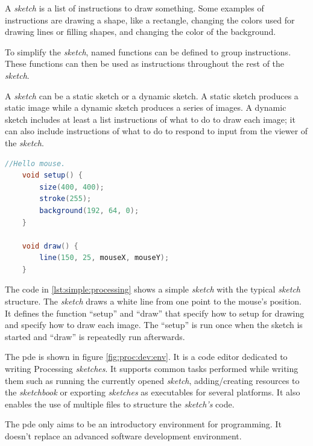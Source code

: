 \documentclass{./llncs2e/llncs}
\begin{document}
	A \emph{sketch} is a list of instructions to draw something. 
	Some examples of instructions are drawing a shape, like a rectangle, changing the colors used for drawing lines or filling shapes, and changing the color of the background.
	
	To simplify the \emph{sketch}, named functions can be defined to group instructions. 
	These functions can then be used as instructions throughout the rest of the \emph{sketch}.
	
	A \emph{sketch} can be a static sketch or a dynamic sketch. 
	A static sketch produces a static image while a dynamic sketch produces a series of images. 
	A dynamic sketch includes at least a list instructions of what to do to draw each image; it can also include instructions of what to do to respond to input from the viewer of the \emph{sketch}.
	
	\begin{lstlisting}[caption={A simple Processing sketch},label={lst:simple:processing},language=Java]
	//Hello mouse.
	void setup() {
		size(400, 400);
		stroke(255);
		background(192, 64, 0);
	}
	
	void draw() {
		line(150, 25, mouseX, mouseY);
	}
	\end{lstlisting}
	
	The code in \ref{lst:simple:processing} shows a simple \emph{sketch} with the typical \emph{sketch} structure. 
	The \emph{sketch} draws a white line from one point to the mouse's position. 
	It defines the function ``setup'' and  ``draw'' that specify how to setup for drawing and specify how to draw each image. 
	The ``setup'' is run once when the sketch is started and ``draw'' is repeatedly run afterwards.
	
	The \ac{pde} is shown in figure \ref{fig:proc:dev:env}. 
	It is a code editor dedicated to writing Processing \emph{sketches}. 
	It supports common tasks performed while writing them such as running the currently opened \emph{sketch}, adding/creating resources to the \emph{sketchbook} or exporting \emph{sketches} as executables for several platforms. 
	It also enables the use of multiple files to structure the \emph{sketch's} code.
	
	The \ac{pde} only aims to be an introductory environment for programming. 
	It doesn't replace an advanced software development environment.
	
\end{document}

